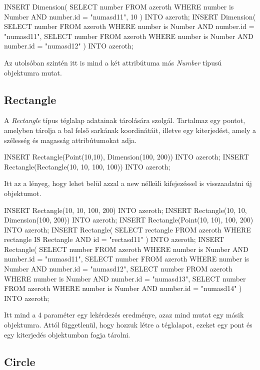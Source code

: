 \begin{sql}
INSERT Dimension(
    SELECT number FROM azeroth
    WHERE number is Number AND number.id = "numasd11", 10
) INTO azeroth;
INSERT Dimension(
    SELECT number FROM azeroth
    WHERE number is Number AND number.id = "numasd11",
    SELECT number FROM azeroth
    WHERE number is Number AND number.id = "numasd12"
) INTO azeroth;
\end{sql}

Az utolsóban szintén itt is mind a két attribútuma más \textit{Number} típusú objektumra mutat.

\subsection{Rectangle}

A \textit{Rectangle} típus téglalap adatainak tárolására szolgál. Tartalmaz egy pontot, amelyben tárolja a bal felső sarkának koordinátáit, illetve egy kiterjedést, amely a szélesség és magasság attribútumokat adja.

\begin{sql}
INSERT Rectangle(Point(10,10), Dimension(100, 200)) INTO azeroth;
INSERT Rectangle(Rectangle(10, 10, 100, 100)) INTO azeroth;
\end{sql}

Itt az a lényeg, hogy lehet belül azzal a new nélküli kifejezéssel is visszaadatni új objektumot.

\begin{sql}
INSERT Rectangle(10, 10, 100, 200) INTO azeroth;
INSERT Rectangle(10, 10, Dimension(100, 200)) INTO azeroth;
INSERT Rectangle(Point(10, 10), 100, 200) INTO azeroth;
INSERT Rectangle(
    SELECT rectangle FROM azeroth
    WHERE rectangle IS Rectangle AND id = "rectasd11"
) INTO azeroth;
INSERT Rectangle(
    SELECT number FROM azeroth
    WHERE number is Number AND number.id = "numasd11",
    SELECT number FROM azeroth
    WHERE number is Number AND number.id = "numasd12",
    SELECT number FROM azeroth
    WHERE number is Number AND number.id = "numasd13",
    SELECT number FROM azeroth
    WHERE number is Number AND number.id = "numasd14"
) INTO azeroth;
\end{sql}

Itt mind a 4 paraméter egy lekérdezés eredménye, azaz mind mutat egy másik objektumra.
Attól függetlenül, hogy hozzuk létre a téglalapot, ezeket egy pont és egy kiterjedés objektumban fogja tárolni.

\subsection{Circle}

